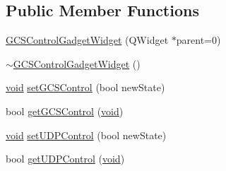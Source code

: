 \subsection*{\-Public \-Member \-Functions}
\begin{DoxyCompactItemize}
\item 
\hyperlink{group___g_c_s_control_gadget_plugin_ga631488a05f2911312aa2701deafc099e}{\-G\-C\-S\-Control\-Gadget\-Widget} (\-Q\-Widget $\ast$parent=0)
\item 
\hyperlink{group___g_c_s_control_gadget_plugin_gac531923c2dca3888a8ff072acf4949f6}{$\sim$\-G\-C\-S\-Control\-Gadget\-Widget} ()
\item 
\hyperlink{group___u_a_v_objects_plugin_ga444cf2ff3f0ecbe028adce838d373f5c}{void} \hyperlink{group___g_c_s_control_gadget_plugin_gaa7bf374aeebdf1e677885605644c508c}{set\-G\-C\-S\-Control} (bool new\-State)
\item 
bool \hyperlink{group___g_c_s_control_gadget_plugin_ga4802bb05a27e5b7b98fba727aa298cbf}{get\-G\-C\-S\-Control} (\hyperlink{group___u_a_v_objects_plugin_ga444cf2ff3f0ecbe028adce838d373f5c}{void})
\item 
\hyperlink{group___u_a_v_objects_plugin_ga444cf2ff3f0ecbe028adce838d373f5c}{void} \hyperlink{group___g_c_s_control_gadget_plugin_ga8e3fea7e5b4e9a7811faccbbe646ad37}{set\-U\-D\-P\-Control} (bool new\-State)
\item 
bool \hyperlink{group___g_c_s_control_gadget_plugin_ga0354d422f9780a2e5fb610c0decf3e13}{get\-U\-D\-P\-Control} (\hyperlink{group___u_a_v_objects_plugin_ga444cf2ff3f0ecbe028adce838d373f5c}{void})
\end{DoxyCompactItemize}
